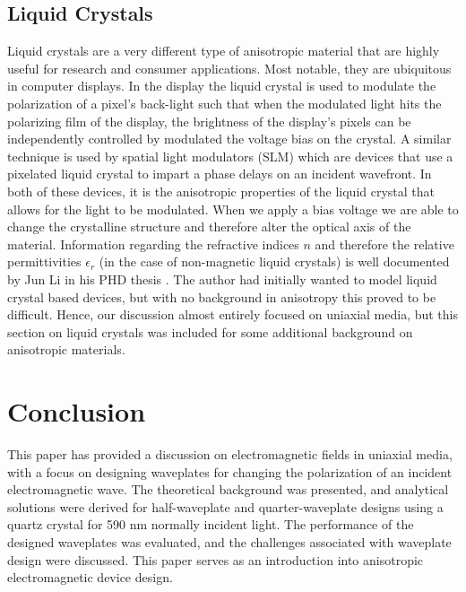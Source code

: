 \documentclass{optica-article}
\begin{document}
\subsection{Liquid Crystals}
Liquid crystals are a very different type of anisotropic material that are 
highly useful for research and consumer applications. Most notable, they 
are ubiquitous in computer displays. In the display the liquid crystal is used
to modulate the polarization of a pixel's back-light such that when the 
modulated light hits the polarizing film of the display, the brightness of the
display's pixels can be independently controlled by modulated the voltage bias
on the crystal. A similar technique is used by spatial light modulators (SLM) 
which are devices that use a pixelated liquid crystal to impart a phase
delays on an incident wavefront. In both of these devices, it is the anisotropic
properties of the liquid crystal that allows for the light to be modulated.
When we apply a bias voltage we are able to change the crystalline structure
and therefore alter the optical axis of the material. Information regarding
the refractive indices $n$ and therefore the relative permittivities 
$\epsilon_r$ (in the case of non-magnetic liquid crystals) is well documented 
by Jun Li in his PHD thesis \cite{LC}. The author had initially wanted to model
liquid crystal based devices, but with no background in anisotropy this proved
to be difficult. Hence, our discussion almost 
entirely focused on uniaxial media, but this section on liquid crystals was
included for some additional background on anisotropic materials.


\section{Conclusion}
This paper has provided a discussion on electromagnetic 
fields in uniaxial media, with a focus on designing waveplates for changing the 
polarization of an incident electromagnetic wave. The theoretical background was
presented, and analytical solutions were derived for half-waveplate and 
quarter-waveplate designs using a quartz crystal for 590 nm normally incident 
light. The performance of the designed waveplates was evaluated, and the 
challenges associated with waveplate design were discussed. This paper serves 
as an introduction into anisotropic electromagnetic device design.
\end{document}
